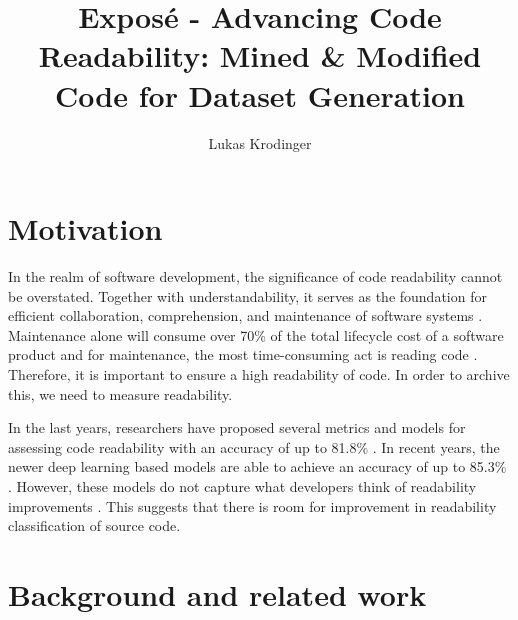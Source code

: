 \documentclass[%
class=scrreprt,
chapterprefix=false,%
open=right,%
twoside=false,%
paper=a4,%
logofile={Logo\_zentral\_farbig\_EN.png},%
thesistype=masterproposal,%
UKenglish,%
]{se2thesis}
\author{Lukas Krodinger}
\title{Exposé - Advancing Code Readability: Mined \& Modified Code for Dataset Generation}
\institute{Chair of Software Engineering II}
\begin{document}
	
	\frontmatter
	
	\maketitle
	
	\mainmatter
	
	\section{Motivation} \label{Motivation}
	
	
	In the realm of software development, the significance of code readability cannot be overstated. Together with understandability, it 	serves as the foundation for efficient collaboration, comprehension, and maintenance of software systems \cite{posnett2011simpler, aggarwal2002integrated}. 
	Maintenance alone will consume over 70\% of the total lifecycle cost of a software product and for maintenance, the most time-consuming act is reading code \cite{buse2009learning, deimel1985uses, rugaber2000use, boehm2001defect}.
	Therefore, it is important to ensure a high readability of code. In order to archive this, we need to measure readability.
	
	In the last years, researchers have proposed several metrics and models for assessing code readability with an accuracy of up to 81.8\% \cite{buse2009learning, posnett2011simpler, dorn2012general, daka2015modeling}. In recent years, the newer deep learning based models are able to achieve an accuracy of up to 85.3\% \cite{mi2018improving, mi2022towards}.
	However, these models do not capture what developers think of readability improvements \cite{fakhoury2019improving}. This suggests that there is room for improvement in readability classification of source code.
	
	\section{Background and related work} \label{Background and related work}
	
\end{document}
